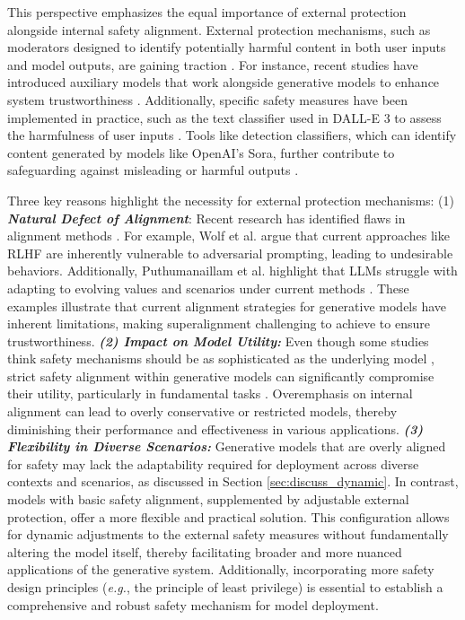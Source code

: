 This perspective emphasizes the equal importance of external protection alongside internal safety alignment. External protection mechanisms, such as moderators designed to identify potentially harmful content in both user inputs and model outputs, are gaining traction \cite{openaimoderation, facebookmoderation}. For instance, recent studies have introduced auxiliary models that work alongside generative models to enhance system trustworthiness \cite{yuan2024rigorllm, defendingjailbreak, huang20241+}. Additionally, specific safety measures have been implemented in practice, such as the text classifier used in DALL-E 3 to assess the harmfulness of user inputs \cite{ramesh2024dalle3}. Tools like detection classifiers, which can identify content generated by models like OpenAI's Sora, further contribute to safeguarding against misleading or harmful outputs \cite{sora_openai_safety}.

Three key reasons highlight the necessity for external protection mechanisms: (1) \textbf{\textit{Natural Defect of Alignment}}: Recent research has identified flaws in alignment methods \cite{xu2024dpo, wolf2023fundamental, rlhf, puthumanaillam2024moral}. For example, Wolf et al. \cite{wolf2023fundamental} argue that current approaches like RLHF \cite{rlhf} are inherently vulnerable to adversarial prompting, leading to undesirable behaviors. Additionally, Puthumanaillam et al. highlight that LLMs struggle with adapting to evolving values and scenarios under current methods \cite{puthumanaillam2024moral}. These examples illustrate that current alignment strategies for generative models have inherent limitations, making superalignment \cite{burns2024weak} challenging to achieve to ensure trustworthiness. \textbf{\textit{(2) Impact on Model Utility:}} Even though some studies think safety mechanisms should be as sophisticated as the underlying model \cite{wei2024jailbroken}, strict safety alignment within generative models can significantly compromise their utility, particularly in fundamental tasks \cite{wolf2024tradeoffs, tuan2024towards, yuan2024rigorllm, zhang2024bi}. Overemphasis on internal alignment can lead to overly conservative or restricted models, thereby diminishing their performance and effectiveness in various applications. \textbf{\textit{(3) Flexibility in Diverse Scenarios:}} Generative models that are overly aligned for safety may lack the adaptability required for deployment across diverse contexts and scenarios, as discussed in Section \ref{sec:discuss_dynamic}. In contrast, models with basic safety alignment, supplemented by adjustable external protection, offer a more flexible and practical solution. This configuration allows for dynamic adjustments to the external safety measures without fundamentally altering the model itself, thereby facilitating broader and more nuanced applications of the generative system. Additionally, incorporating more safety design principles (\emph{e.g.}, the principle of least privilege) is essential to establish a comprehensive and robust safety mechanism for model deployment.

